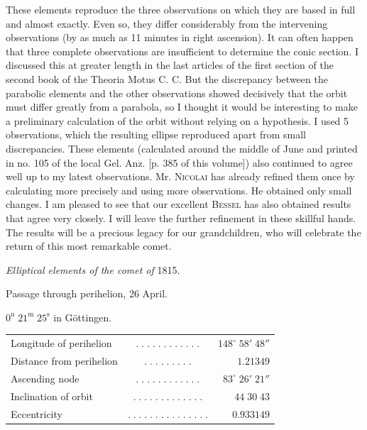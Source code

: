 \par\indent These elements reproduce the three observations on which they are based in full and almost exactly. Even so, they differ considerably from the intervening observations (by as much as 11 minutes in right ascension). It can often happen that three complete observations are insufficient to determine the conic section. I discussed this at greater length in the last articles of the first section of the second book of the Theoria Motus C. C. But the discrepancy between the parabolic elements and the other observations showed decisively that the orbit must differ greatly from a parabola, so I thought it would be interesting to make a preliminary calculation of the orbit without relying on a hypothesis. I used 5 observations, which the resulting ellipse reproduced apart from small discrepancies. These elements (calculated around the middle of June and printed in no. 105 of the local Gel. Anz. [p. 385 of this volume]) also continued to agree well up to my latest observations. Mr. \textsc{Nicolai} has already refined them once by calculating more precisely and using more observations. He obtained only small changes. I am pleased to see that our excellent \textsc{Bessel} has also obtained results that agree very closely. I will leave the further refinement in these skillful hands. The results will be a precious legacy for our grandchildren, who will celebrate the return of this most remarkable comet.

\begin{center}
\emph{Elliptical elements of the comet of} 1815.
\end{center}

\begin{center}\fontsize{10}{12}\selectfont Passage through perihelion, 26 April.\par $0^{\mathrm u}\;21^{\mathrm m}\;25^{\mathrm s}$ in Göttingen.\end{center}
\begin{center}\fontsize{9}{11}\selectfont\setlength{\tabcolsep}{2pt}\renewcommand{\arraystretch}{1.15}\begin{tabular}{lcr}
Longitude of perihelion & $.\;.\;.\;.\;.\;.\;.\;.\;.\;.\;.\;.$ & $148^\circ\;58'\;48''$\\
Distance from perihelion & $.\;.\;.\;.\;.\;.\;.\;.\;.$ & $1.21349$\\
Ascending node & $.\;.\;.\;.\;.\;.\;.\;.\;.\;.\;.\;.$ & $83^\circ\;26'\;21''$\\
Inclination of orbit & $.\;.\;.\;.\;.\;.\;.\;.\;.\;.\;.\;.\;.$ & $44\;30\;43$\\
Eccentricity & $.\;.\;.\;.\;.\;.\;.\;.\;.\;.\;.\;.\;.\;.\;.$ & $0.933149$\\
\end{tabular}\end{center}

